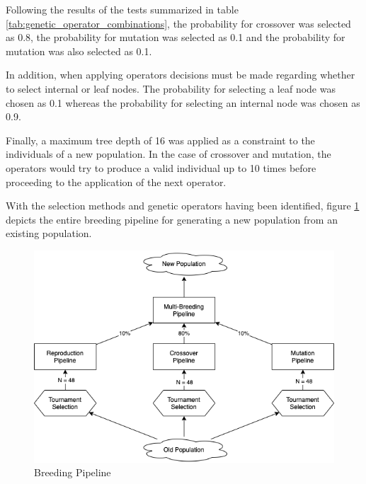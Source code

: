 Following the results of the tests summarized in table \ref{tab:genetic_operator_combinations}, the probability for crossover was selected as 0.8, the probability for mutation was selected as 0.1 and the probability for mutation was also selected as 0.1.

In addition, when applying operators decisions must be made regarding whether to select internal or leaf nodes. The probability for selecting a leaf node was chosen as 0.1 whereas the probability for selecting an internal node was chosen as 0.9.

Finally, a maximum tree depth of 16 was applied as a constraint to the individuals of a new population. In the case of crossover and mutation, the operators would try to produce a valid individual up to 10 times before proceeding to the application of the next operator.

With the selection methods and genetic operators having been identified, figure \ref{fig:breeding_pipeline} depicts the entire breeding pipeline for generating a new population from an existing population.

\begin{figure}[H]
\centering
\includegraphics[width=\textwidth]{report/05_genetic_operators/breeding_pipeline.png}
\caption{Breeding Pipeline}
\label{fig:breeding_pipeline}
\end{figure}